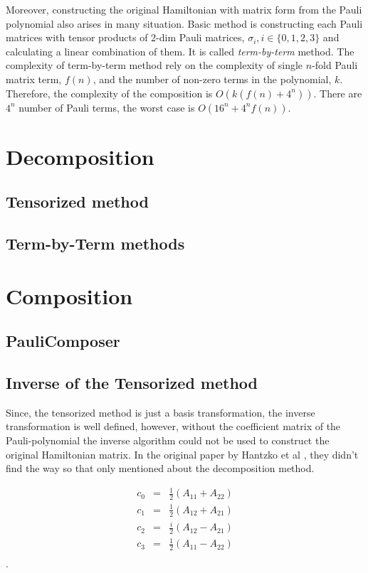 Moreover, constructing the original Hamiltonian with matrix form
from the Pauli polynomial also arises in many situation.
Basic method is constructing each Pauli matrices with tensor products 
of 2-dim Pauli matrices, $\sigma_{i}, i \in \{0, 1, 2, 3\}$ 
and calculating a linear combination of them.
It is called \textit{term-by-term} method.
The complexity of term-by-term method rely on the complexity of 
single $n$-fold Pauli matrix term, $f(n)$,
and the number of non-zero terms in the polynomial, $k$.
Therefore, the complexity of the composition is $O(k(f(n) + 4^n))$.
There are $4^n$ number of Pauli terms, the worst case is $O(16^n + 4^n f(n))$.


\section{Decomposition}

\subsection{Tensorized method}


\subsection{Term-by-Term methods}

\section{Composition}
\subsection{PauliComposer}

\subsection{Inverse of the Tensorized method}

Since, the tensorized method is just a basis transformation, 
the inverse transformation is well defined, 
however, without the coefficient matrix of the Pauli-polynomial 
the inverse algorithm could not be used to construct the original 
Hamiltonian matrix. In the original paper by Hantzko et al \cite{hantzko_tensorized_2023},
they didn't find the way so that only mentioned about the decomposition method.

\begin{equation}
    \label{eq:restore}
    \begin{array}{ccc}
        c_0 &=& \frac{1}{2} (A_{11} + A_{22})\\
        c_1 &=& \frac{1}{2} (A_{12} + A_{21})\\
        c_2 &=& \frac{i}{2} (A_{12} - A_{21})\\
        c_3 &=& \frac{1}{2} (A_{11} - A_{22})\\
    \end{array}
\end{equation}.

